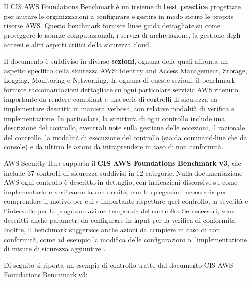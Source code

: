 Il CIS AWS Foundations Benchmark è un insieme di \textbf{best practice} progettate per aiutare le organizzazioni a configurare e gestire in modo sicuro le proprie risorse AWS. Questo benchmark fornisce linee guida dettagliate su come proteggere le istanze computazionali, i servizi di archiviazione, la gestione degli accessi e altri aspetti critici della sicurezza cloud.

Il documento è suddiviso in diverse \textbf{sezioni}, ognuna delle quali affronta un aspetto specifico della sicurezza AWS: Identity and Access Management, Storage, Logging, Monitoring e Networking. In ognuna di queste sezioni, il benchmark fornisce raccomandazioni dettagliate su ogni particolare servizio AWS ritenuto importante da rendere compliant e una serie di controlli di sicurezza da implementare descritti in maniera verbosa, con relative modalità di verifica e implementazione. In particolare, la struttura di ogni controllo include una descrizione del controllo, eventuali note sulla gestione delle eccezioni, il razionale del controllo, la modalità di esecuzione del controllo (sia da command-line che da console) e da ultimo le azioni da intraprendere in caso di non conformità. 

AWS Security Hub supporta il \textbf{CIS AWS Foundations Benchmark v3}, che include 37 controlli di sicurezza suddivisi in 12 categorie. Nulla documentazione AWS ogni controllo è descritto in dettaglio, con indicazioni discorsive su come implementarlo e verificarne la conformità, con le spiegazioni necessarie per comprendere il motivo per cui è importante rispettare quel controllo, la severità e l'intervallo per la programmazione temporale del controllo. Se necessari, sono descritti anche parametri da configurare in input per la verifica di conformità. Inoltre, il benchmark suggerisce anche azioni da compiere in caso di non conformità, come ad esempio la modifica delle configurazioni o l'implementazione di misure di sicurezza aggiuntive \cite{cisawsbenchmarkv3}.

Di seguito si riporta un esempio di controllo tratto dal documento CIS AWS Foundations Benchmark v3:

